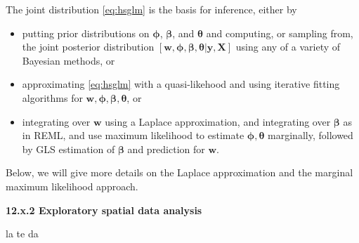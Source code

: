 \documentclass[12pt, titlepage]{article}
\begin{document}
The joint distribution \ref{eq:hsglm} is the basis for inference, either by
\begin{itemize}
\item putting prior distributions on $\boldsymbol{\phi}$, $\boldsymbol{\beta}$, and $\boldsymbol{\theta}$ and computing, or sampling from, the joint posterior distribution $[\mathbf{w},\boldsymbol{\phi},\boldsymbol{\beta},\boldsymbol{\theta}|\mathbf{y},\mathbf{X}]$ using any of a variety of Bayesian methods, or 
\item approximating \eqref{eq:hsglm} with a quasi-likehood and using iterative fitting algorithms for $\mathbf{w},\boldsymbol{\phi},\boldsymbol{\beta},\boldsymbol{\theta}$, or
\item integrating over $\mathbf{w}$ using a Laplace approximation, and integrating over $\boldsymbol{\beta}$ as in REML, and use maximum likelihood to estimate $\boldsymbol{\phi},\boldsymbol{\theta}$ marginally, followed by GLS estimation of $\boldsymbol{\beta}$ and prediction for $\mathbf{w}$.
\end{itemize}

Below, we will give more details on the Laplace approximation and the marginal maximum likelihood approach.


{\large \flushleft \textbf{12.x.2 Exploratory spatial data analysis}}

la te da

\end{document}
